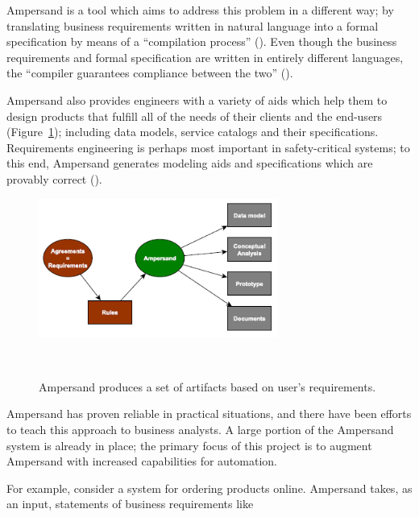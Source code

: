 \documentclass[12pt]{report}
\begin{document}
Ampersand is a tool which aims to address this problem in a different way; by
translating business requirements written in natural language into a formal
specification by means of a ``compilation process'' (\cite{derFun}). 
Even though the business requirements and formal specification are written in
entirely different languages, the ``compiler guarantees compliance between the
two'' (\cite[2]{derFun}). 

Ampersand also provides engineers with a variety of aids which
help them to design products that fulfill all of the needs of their clients and
the end-users (Figure~\ref{fig:figure1}); including data models, service catalogs and their
specifications. Requirements engineering is perhaps most important in
safety-critical systems; to this end, Ampersand generates modeling aids and
specifications which are provably correct (\cite{derFun}). 

\begin{figure}
  \centering
    \includegraphics[width=0.7\textwidth]{../figures/ampersand_artifacts}
\caption{Ampersand produces a set of artifacts based on user's requirements.}~\label{fig:figure1}
\end{figure}

Ampersand has proven reliable in practical situations, and there have been
efforts to teach this approach to business analysts. A large portion of the
Ampersand system is already in place; the primary focus of this project is to
augment Ampersand with increased capabilities for automation.

For example, consider a system for ordering products online. Ampersand takes, as
an input, statements of business requirements like

\begin{quotation}
\end{quotation}
\end{document}
